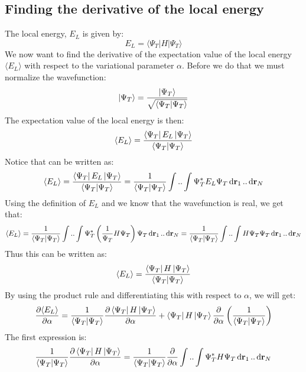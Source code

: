 \documentclass[a4paper, 10pt]{article}
\begin{document}
\begin{appendices}
		\section{Finding the derivative of the local energy}\label{ap:derivative_of_local_energy}
		The local energy, $E_L$ is given by:
		\begin{equation}
		E_L=\langle \Psi_T | H| \Psi_T \rangle
		\end{equation}
We now want to find the derivative of the expectation value of the local energy $\langle E_{L}\rangle$
with respect to the variational parameter $\alpha$. Before we do that we must normalize the wavefunction:
\begin{align}
\ket{\Psi_{T}} = \frac{\ket{\Psi_{T}}}{\sqrt{\braket{\Psi_{T}}}}
\end{align}
The expectation value of the local energy is then:
\begin{align}
\langle E_{L} \rangle = \frac{\bra{\Psi_{T}}E_{L}\ket{\Psi_{T}}}{\braket{\Psi_{T}}}
\end{align}
Notice that can be written as:
\begin{align}
\langle E_{L} \rangle = \frac{\bra{\Psi_{T}}E_{L}\ket{\Psi_{T}}}{\braket{\Psi_{T}}}
= \frac{1}{\braket{\Psi_{T}}}\int..\int \Psi_{T}^{*}E_{L}\Psi_{T}\dd{\bold{r}_{1}}..\dd{\bold{r}_{N}}
\end{align}
Using the definition of $E_{L}$ and we know that the wavefunction is real, we get that:
\begin{align}
\langle E_{L} \rangle = \frac{1}{\braket{\Psi_{T}}}\int..\int \Psi_{T}^{*}\left(\frac{1}{\Psi_{T}}H\Psi_{T}\right)\Psi_{T}\dd{\bold{r}_{1}}..\dd{\bold{r}_{N}}
= \frac{1}{\braket{\Psi_{T}}}\int..\int H\Psi_{T}\Psi_{T}\dd{\bold{r}_{1}}..\dd{\bold{r}_{N}}
\end{align}
Thus this can be written as:
\begin{align}
\langle E_{L} \rangle = \frac{\bra{\Psi_{T}}H\ket{\Psi_{T}}}{\braket{\Psi_{T}}}
\end{align}
By using the product rule and differentiating this with respect to $\alpha$,
we will get:
\begin{align}
\pdv{\langle E_{L} \rangle }{\alpha} = \frac{1}{\braket{\Psi_{T}}}\pdv{\bra{\Psi_{T}}H\ket{\Psi_{T}}}{\alpha}
+ \bra{\Psi_{T}}H\ket{\Psi_{T}}\pdv{\alpha}\left(\frac{1}{\braket{\Psi_{T}}}\right)
\end{align}
The first expression is:
\begin{align}
\frac{1}{\braket{\Psi_{T}}}\pdv{\bra{\Psi_{T}}H\ket{\Psi_{T}}}{\alpha}
=
\frac{1}{\braket{\Psi_{T}}}\pdv{\alpha}\int..\int\Psi_{T}^{*}H\Psi_{T}\dd{\bold{r}_{1}}..\dd{\bold{r}_{N}}

\end{align}
\end{appendices}
\end{document}
